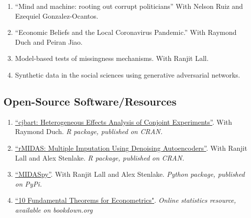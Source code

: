 \documentclass[11pt, a4paper]{article}
\begin{document}
\begin{enumerate}

\item ``Mind and machine: rooting out corrupt politicians'' With Nelson Ruiz and Ezequiel Gonzalez-Ocantos. 

\item ``Economic Beliefs and the Local Coronavirus Pandemic.'' With Raymond Duch and Peiran Jiao.

\item Model-based tests of missingness mechanisms. With Ranjit Lall.

\item Synthetic data in the social sciences using generative adversarial networks.


\end{enumerate}


\subsection*{Open-Source Software/Resources}

\begin{enumerate}

  \item \href{https://CRAN.R-project.org/package=cjbart}{``cjbart: Heterogeneous Effects Analysis of Conjoint Experiments''}. With Raymond Duch. \textit{R package, published on CRAN.}

  \item \href{https://CRAN.R-project.org/package=rMIDAS}{``rMIDAS: Multiple Imputation Using Denoising Autoencoders''}. With Ranjit Lall and Alex Stenlake. \textit{R package, published on CRAN.}

  \item \href{https://pypi.org/project/MIDASpy/}{``MIDASpy''}. With Ranjit Lall and Alex Stenlake. \textit{Python package, published on PyPi.}

  \item \href{https://bookdown.org/ts_robinson1994/10_fundamental_theorems_for_econometrics/vtDma6bZJ/}{``10 Fundamental Theorems for Econometrics"}. \textit{Online statistics resource, available on bookdown.org}

\end{enumerate}
\end{document}
